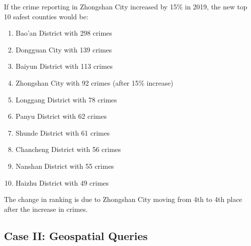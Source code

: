\begin{itemize}
\begin{itemize}
\begin{tcolorbox}[colback=white!95!black, colframe=black, title=Q3 Response, fontupper=\scriptsize]
If the crime reporting in Zhongshan City increased by 15\% in 2019, the new top 10 safest counties would be:

\begin{enumerate}
  \item Bao'an District with 298 crimes
  \item Dongguan City with 139 crimes
  \item Baiyun District with 113 crimes
  \item Zhongshan City with 92 crimes (after 15\% increase)
  \item Longgang District with 78 crimes
  \item Panyu District with 62 crimes
  \item Shunde District with 61 crimes
  \item Chancheng District with 56 crimes
  \item Nanshan District with 55 crimes
  \item Haizhu District with 49 crimes
\end{enumerate}

The change in ranking is due to Zhongshan City moving from 4th to 4th place after the increase in crimes.
\end{tcolorbox}

    
\end{itemize}

\subsection{Case II: Geospatial Queries}








\end{itemize}
